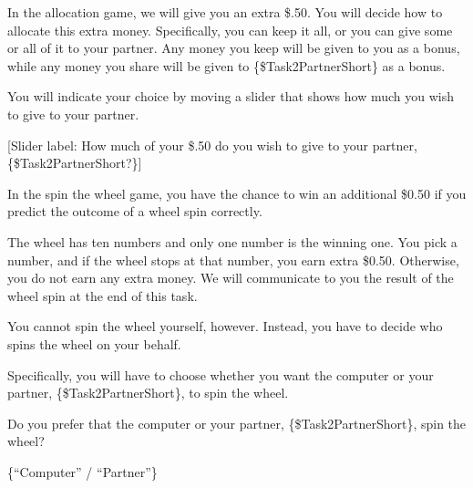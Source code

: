 \begin{description}[listparindent = 1.5em]
    \item[Allocation game:]  \hspace{1cm}
    
    In the allocation game, we will give you an extra \$.50. You will decide
    how to allocate this extra money. Specifically, you can keep it all, or you
    can give some or all of it to your partner. Any money you keep will be given
    to you as a bonus, while any money you share will be given to
    \{\$Task2PartnerShort\} as a bonus. 
    
    You will indicate your choice by moving a
    slider that shows how much you wish to give to your partner. 
    
    [Slider label:
    How much of your \$.50 do you wish to give to your partner,
    \{\$Task2PartnerShort?\}]
\end{description}

\begin{description}[listparindent = 1.5em]
    \item[Spin the wheel game:] \hspace{1cm}
    
In the spin the wheel game, you have the chance to win an additional
    \$0.50 if you predict the outcome of a wheel spin correctly.  
      
    The wheel has ten
    numbers and only one number is the winning one. You pick a number, and if
    the wheel stops at that number, you earn extra \$0.50. Otherwise, you do not
    earn any extra money. We will communicate to you the result of the wheel
    spin at the end of this task. 
    
    You cannot spin the wheel yourself, however.
    Instead, you have to decide who spins the wheel on your behalf. 
    
    Specifically,
    you will have to choose whether you want the computer or your partner,
    \{\$Task2PartnerShort\}, to spin the wheel. 
    
    Do you prefer that the computer or
    your partner, \{\$Task2PartnerShort\}, spin the wheel? 
    
    \{``Computer'' /
    ``Partner''\}
\end{description}

